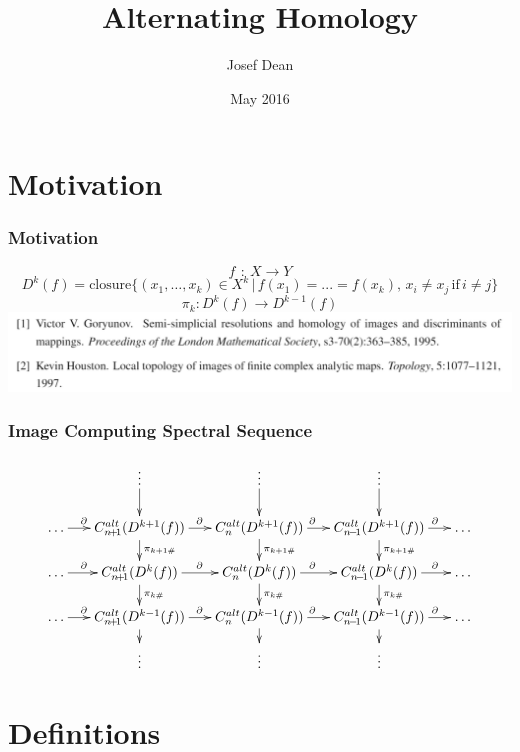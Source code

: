 \documentclass{beamer}[10pt]
\title{Alternating Homology}
\author{Josef Dean }
\date{May 2016}
\DeclareMathOperator{\co}{\!\colon\!}
\theoremstyle{definition}
\begin{document}
\begin{frame}
\titlepage
\end{frame}

\section{Motivation}

\begin{frame}
\frametitle{Motivation}
$$f\co X\longrightarrow Y$$
\vspace{4mm}
{\small $$D^k(f)=\text{closure}\{(x_1,\dots,x_k)\in X^k\,|\,f(x_1)=...=f(x_k),\, x_i\neq x_j\,\text{if}\,i\neq j\}$$}
\vspace{4mm}
$$\pi_k:D^k(f)\longrightarrow D^{k-1}(f)$$
\vspace{3mm}
\includegraphics[scale=0.38]{MotivationSources.PNG}
\end{frame}

\begin{frame}[t]
\frametitle{Image Computing Spectral Sequence}
\begin{displaymath}
\xymatrix@R=0.5cm@C=0.55cm{
& \vdots \ar[d] & \vdots \ar[d] & \vdots \ar[d] & \\
\dots \ar[r]^{\partial\quad\quad} & C_{n\!+\!1}^{alt}(D^{k+1}(f)) \ar[r]^\partial \ar[d]^{\pi_{k+1\#}}  & C_{n}^{alt}(D^{k+1}(f)) \ar[r]^{\partial\quad} \ar[d]^{\pi_{k+1\#}}  & C_{n\!-\!1}^{alt}(D^{k+1}(f)) \ar[r]^{\quad\quad\partial} \ar[d]^{\pi_{k+1\#}}  & \dots \\
\dots \ar[r]^{\partial\quad\quad} & C_{n\!+\!1}^{alt}(D^{k}(f)) \ar[r]^\partial \ar[d]^{\pi_{k\#}}  & C_{n}^{alt}(D^{k}(f)) \ar[r]^{\partial\quad} \ar[d]^{\pi_{k\#}}  & C_{n\!-\!1}^{alt}(D^{k}(f)) \ar[r]^{\quad\quad\partial} \ar[d]^{\pi_{k\#}}  & \dots \\
\dots \ar[r]^{\partial\quad\quad} & C_{n\!+\!1}^{alt}(D^{k-1}(f)) \ar[r]^\partial \ar[d]  & C_{n}^{alt}(D^{k-1}(f)) \ar[r]^{\partial\quad} \ar[d] & C_{n\!-\!1}^{alt}(D^{k-1}(f)) \ar[r]^{\quad\quad\partial} \ar[d] & \dots \\
& \vdots & \vdots & \vdots &
}
\end{displaymath}
\end{frame}

\section{Definitions}
\end{document}
